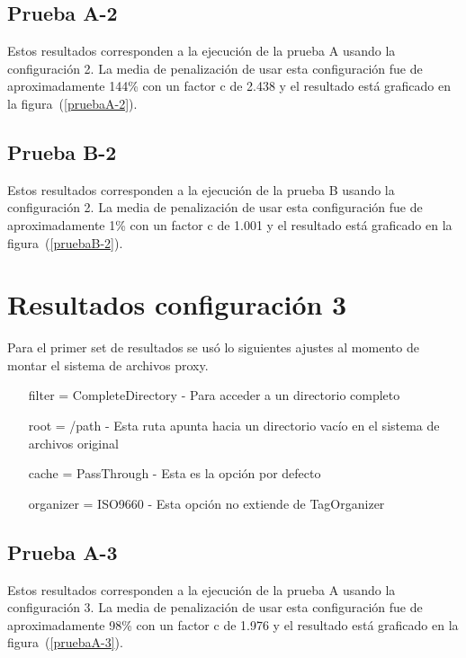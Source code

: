 \subsection{Prueba A-2}

Estos resultados corresponden a la ejecución de la prueba A usando la configuración 2. La media de penalización de usar esta configuración fue de aproximadamente 144\% con un factor c de 2.438 y el resultado está graficado en la figura~(\ref{pruebaA-2}).


\subsection{Prueba B-2}

Estos resultados corresponden a la ejecución de la prueba B usando la configuración 2. La media de penalización de usar esta configuración fue de aproximadamente 1\% con un factor c de 1.001 y el resultado está graficado en la figura~(\ref{pruebaB-2}).


\section{Resultados configuración 3}

Para el primer set de resultados se usó lo siguientes ajustes al momento de montar el sistema de archivos proxy.

\begin{itemize}
\item[filter] = CompleteDirectory - Para acceder a un directorio completo
\item[root] = /path - Esta ruta apunta hacia un directorio vacío en el sistema de archivos original
\item[cache] = PassThrough - Esta es la opción por defecto
\item[organizer] = ISO9660 - Esta opción no extiende de TagOrganizer
\end{itemize}

\subsection{Prueba A-3}

Estos resultados corresponden a la ejecución de la prueba A usando la configuración 3. La media de penalización de usar esta configuración fue de aproximadamente 98\% con un factor c de 1.976 y el resultado está graficado en la figura~(\ref{pruebaA-3}).

